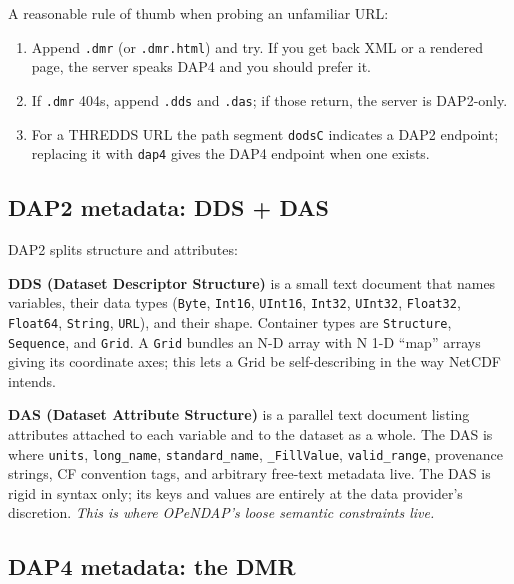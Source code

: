 \documentclass[11pt]{article}
\begin{document}
A reasonable rule of thumb when probing an unfamiliar URL:
\begin{enumerate}
  \item Append \texttt{.dmr} (or \texttt{.dmr.html}) and try. If you
    get back XML or a rendered page, the server speaks DAP4 and you
    should prefer it.
  \item If \texttt{.dmr} 404s, append \texttt{.dds} and \texttt{.das};
    if those return, the server is DAP2-only.
  \item For a THREDDS URL the path segment \texttt{dodsC} indicates a
    DAP2 endpoint; replacing it with \texttt{dap4} gives the DAP4
    endpoint when one exists.
\end{enumerate}

\subsection{DAP2 metadata: DDS + DAS}

DAP2 splits structure and attributes:

\textbf{DDS (Dataset Descriptor Structure)} is a small text document
that names variables, their data types
(\texttt{Byte}, \texttt{Int16}, \texttt{UInt16}, \texttt{Int32},
\texttt{UInt32}, \texttt{Float32}, \texttt{Float64}, \texttt{String},
\texttt{URL}), and their shape. Container types are
\texttt{Structure}, \texttt{Sequence}, and \texttt{Grid}. A
\texttt{Grid} bundles an N-D array with N 1-D ``map'' arrays giving
its coordinate axes; this lets a Grid be self-describing in the way
NetCDF intends.

\textbf{DAS (Dataset Attribute Structure)} is a parallel text document
listing attributes attached to each variable and to the dataset as a
whole. The DAS is where \texttt{units}, \texttt{long\_name},
\texttt{standard\_name}, \texttt{\_FillValue}, \texttt{valid\_range},
provenance strings, CF convention tags, and arbitrary free-text
metadata live. The DAS is rigid in syntax only; its keys and values
are entirely at the data provider's discretion. \emph{This is where
OPeNDAP's loose semantic constraints live.}

\subsection{DAP4 metadata: the DMR}
\end{document}
